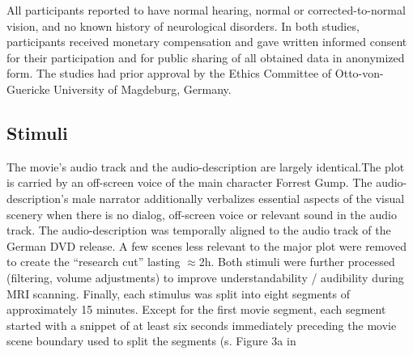 \documentclass[english]{article}
\begin{document}
All participants reported to have normal hearing, normal or corrected-to-normal vision, and no known history of neurological disorders.
In both studies, participants received monetary compensation and gave written informed consent for their participation and for public sharing of all obtained data in anonymized form. The studies had prior approval by the Ethics Committee of Otto-von-Guericke University of Magdeburg, Germany.


\subsection{Stimuli}
The movie's  \citep{ForrestGumpMovie} audio track and the audio-description \citep{ForrestGumpGermanAD} are largely identical.The plot is carried by an off-screen voice of the main character Forrest Gump.
The audio-description's male narrator additionally verbalizes essential aspects of the visual scenery when there is no dialog, off-screen voice or relevant sound in the audio track.
The audio-description was temporally aligned to the audio track of the German DVD release. A few scenes less relevant to the major plot were removed to create the ``research cut'' lasting $\approx$2h. Both stimuli were further processed (filtering, volume adjustments) to improve understandability / audibility during MRI scanning.
Finally, each stimulus was split into eight segments of approximately 15 minutes. Except for the first movie segment, each segment started with a snippet of at least six seconds immediately preceding the movie scene boundary used to split the segments (s. Figure 3a in \citep{hanke2014audiomovie}
\end{document}
